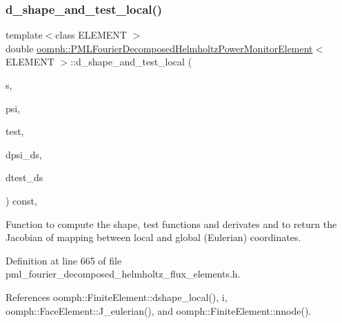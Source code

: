 \subsubsection{\texorpdfstring{d\+\_\+shape\+\_\+and\+\_\+test\+\_\+local()}{d\_shape\_and\_test\_local()}}
{\footnotesize\ttfamily template$<$class E\+L\+E\+M\+E\+NT $>$ \\
double \hyperlink{classoomph_1_1PMLFourierDecomposedHelmholtzPowerMonitorElement}{oomph\+::\+P\+M\+L\+Fourier\+Decomposed\+Helmholtz\+Power\+Monitor\+Element}$<$ E\+L\+E\+M\+E\+NT $>$\+::d\+\_\+shape\+\_\+and\+\_\+test\+\_\+local (\begin{DoxyParamCaption}\item[{const \hyperlink{classoomph_1_1Vector}{Vector}$<$ double $>$ \&}]{s,  }\item[{\hyperlink{classoomph_1_1Shape}{Shape} \&}]{psi,  }\item[{\hyperlink{classoomph_1_1Shape}{Shape} \&}]{test,  }\item[{\hyperlink{classoomph_1_1DShape}{D\+Shape} \&}]{dpsi\+\_\+ds,  }\item[{\hyperlink{classoomph_1_1DShape}{D\+Shape} \&}]{dtest\+\_\+ds }\end{DoxyParamCaption}) const\hspace{0.3cm}{\ttfamily [inline]}, {\ttfamily [protected]}}



Function to compute the shape, test functions and derivates and to return the Jacobian of mapping between local and global (Eulerian) coordinates. 



Definition at line 665 of file pml\+\_\+fourier\+\_\+decomposed\+\_\+helmholtz\+\_\+flux\+\_\+elements.\+h.



References oomph\+::\+Finite\+Element\+::dshape\+\_\+local(), i, oomph\+::\+Face\+Element\+::\+J\+\_\+eulerian(), and oomph\+::\+Finite\+Element\+::nnode().

\mbox{\label{classoomph_1_1PMLFourierDecomposedHelmholtzPowerMonitorElement_ae5bf09c4c5b8d9cf9439f57fc800262c}} 
